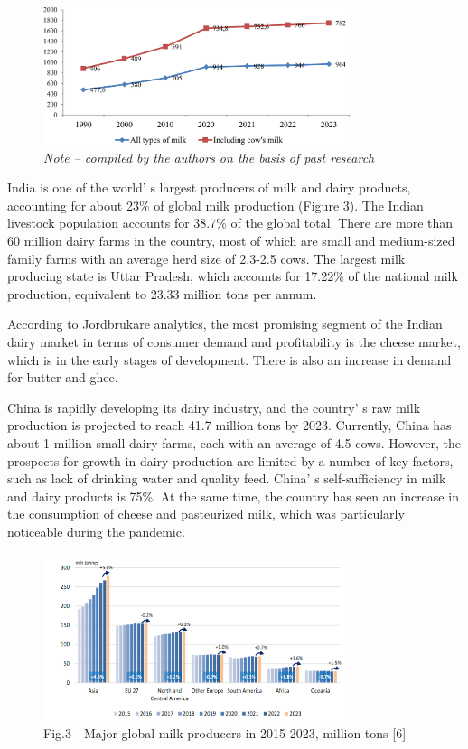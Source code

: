 \begin{figure}[H]
	\centering
	\includegraphics[width=0.8\textwidth]{media/ekon4/image2}
	\caption*{Fig.2 -Dynamics of global production of raw milk, million tons}
	\caption*{\normalfont\emph{Note -- compiled by the authors on the basis of past research}}
\end{figure}

\begin{multicols}{2}
India is one of the world' s largest producers of milk
and dairy products, accounting for about 23\% of global milk production
(Figure 3). The Indian livestock population accounts for 38.7\% of the
global total. There are more than 60 million dairy farms in the country,
most of which are small and medium-sized family farms with an average
herd size of 2.3-2.5 cows. The largest milk producing state is Uttar
Pradesh, which accounts for 17.22\% of the national milk production,
equivalent to 23.33 million tons per annum.

According to Jordbrukare analytics, the most promising segment of the
Indian dairy market in terms of consumer demand and profitability is the
cheese market, which is in the early stages of development. There is
also an increase in demand for butter and ghee.

China is rapidly developing its dairy industry, and the
country' s raw milk production is projected to reach 41.7
million tons by 2023. Currently, China has about 1 million small dairy
farms, each with an average of 4.5 cows. However, the prospects for
growth in dairy production are limited by a number of key factors, such
as lack of drinking water and quality feed. China' s
self-sufficiency in milk and dairy products is 75\%. At the same time,
the country has seen an increase in the consumption of cheese and
pasteurized milk, which was particularly noticeable during the pandemic.
\end{multicols}


\begin{figure}[H]
	\centering
	\includegraphics[width=0.8\textwidth]{media/ekon/image2}
	\caption*{Fig.3 - Major global milk producers in 2015-2023, million tons {[}6{]}}
\end{figure}

